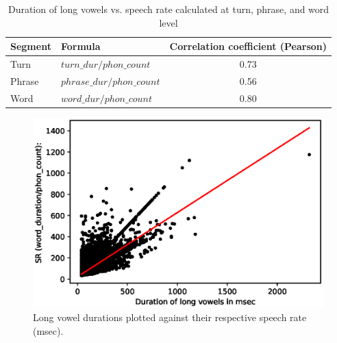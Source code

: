 \documentclass[11pt,a4paper]{scrbook}
\begin{document}
\begin{table}[htbp]
\centering
\vspace{10mm}
\begin{tabular}{|l|l|c|}
\hline
Segment	 & Formula & Correlation coefficient (Pearson)\\
\hline
\hline
Turn	& $turn\_dur/phon\_count$ & 0.73 \\

\hline
Phrase  & $phrase\_dur / phon\_count$ & 0.56\\
	\hline
Word  & $word\_dur / phon\_count$ &  0.80\\
	\hline
\end{tabular}
\vspace{4mm}
\caption {Duration of long vowels vs. speech rate calculated at turn, phrase, and word level} 
\label{tab:SR_corr}
\end{table}

\begin{figure}[htbp]
	\centering
	\includegraphics[width=.8\textwidth]{../Graphen/SR4.eps}
	\vspace{4mm}
	\caption[Speech rate vs long vowel duration]{Long vowel durations plotted against their respective speech rate (msec).}
	\label{fig:wsr}
\end{figure}
\end{document}
